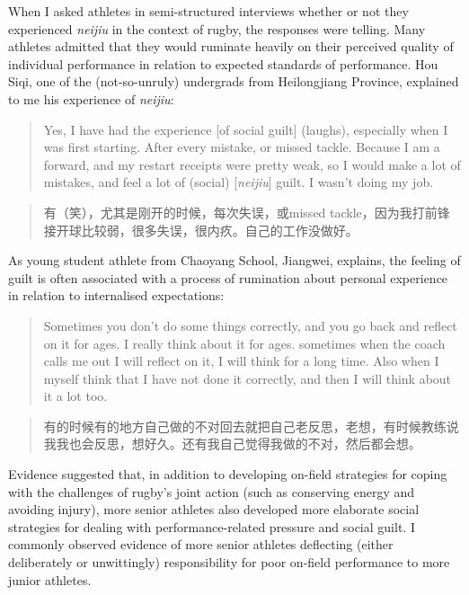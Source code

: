 \begin{CJK}{UTF8}{gbsn}
When I asked athletes in semi-structured interviews whether or not they experienced \textit{neijiu} in the context of rugby, the responses were telling.  Many athletes admitted that they would ruminate heavily on their perceived quality of individual performance in relation to expected standards of performance.  Hou Siqi, one of the (not-so-unruly) undergrads from Heilongjiang Province, explained to me his experience of \textit{neijiu}:

      \begin{quote}
        Yes, I have had the experience [of social guilt] (laughs), especially when I was first starting. After every mistake, or missed tackle.  Because I am a forward, and my restart receipts were pretty weak, so I would make a lot of mistakes, and feel a lot of (social) [\textit{neijiu}] guilt.  I wasn't doing my job.
      \end{quote}

      \begin{quote}
        有（笑），尤其是刚开的时候，每次失误，或missed tackle，因为我打前锋 接开球比较弱，很多失误，很内疚。自己的工作没做好。
      \end{quote}

As young student athlete from Chaoyang School, Jiangwei, explains, the feeling of guilt is often associated with a process of rumination about personal experience in relation to internalised expectations:

      \begin{quote}
        Sometimes you don't do some things correctly, and you go back and reflect on it for ages. I really think about it for ages. sometimes when the coach calls me out I will reflect on it, I will think for a long time. Also when I myself think that I have not done it correctly, and then I will think about it a lot too.
      \end{quote}

      \begin{quote}
        有的时候有的地方自己做的不对回去就把自己老反思，老想，有时候教练说我我也会反思，想好久。还有我自己觉得我做的不对，然后都会想。
      \end{quote}



Evidence suggested that, in addition to developing on-field strategies for coping with the challenges of rugby's joint action (such as conserving energy and avoiding injury), more senior athletes also developed more elaborate social strategies for dealing with performance-related pressure and social guilt.  I commonly observed evidence of more senior athletes deflecting (either deliberately or unwittingly) responsibility for poor on-field performance to more junior athletes.


\end{CJK}

